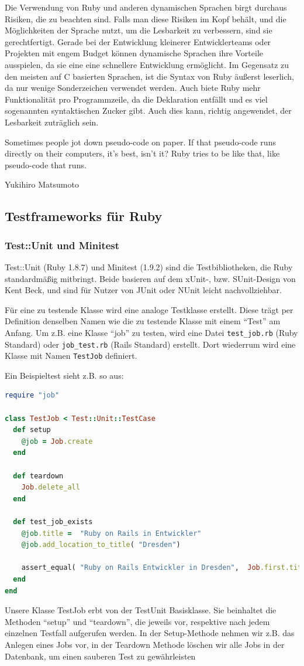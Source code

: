 Die Verwendung von Ruby und anderen dynamischen Sprachen birgt durchaus Risiken, die zu beachten sind. Falls man diese Risiken im Kopf behält, und die Möglichkeiten der Sprache nutzt, um die Lesbarkeit zu verbessern, sind sie gerechtfertigt. Gerade bei der Entwicklung kleinerer Entwicklerteams oder Projekten mit engem Budget können dynamische Sprachen ihre Vorteile ausspielen, da sie eine eine schnellere Entwicklung ermöglicht. Im Gegensatz zu den meisten auf C basierten Sprachen, ist die Syntax von Ruby äußerst leserlich, da nur wenige Sonderzeichen verwendet werden. Auch biete Ruby mehr Funktionalität pro Programmzeile, da die Deklaration entfällt und es viel sogenannten syntaktischen Zucker gibt. Auch dies kann, richtig angewendet, der Lesbarkeit zuträglich sein.
\epigraph{Sometimes people jot down pseudo-code on paper. If that pseudo-code runs directly on their computers, it's best, isn't it? Ruby tries to be like that, like pseudo-code that runs. }{Yukihiro Matsumoto}


\subsection{Testframeworks für Ruby}
\subsubsection{Test::Unit und Minitest}
Test::Unit (Ruby 1.8.7) und Minitest (1.9.2) sind die Testbibliotheken, die Ruby standardmäßig mitbringt. Beide basieren auf dem xUnit-, bzw. SUnit-Design von Kent Beck, und sind für Nutzer von JUnit oder NUnit leicht nachvollziehbar. %

Für eine zu testende Klasse wird eine analoge Testklasse erstellt. Diese trägt per Definition denselben Namen wie die zu testende Klasse mit einem "`Test"' am Anfang. Um z.B. eine Klasse "`job"' zu testen, wird eine Datei \texttt{test\_job.rb} (Ruby Standard) oder \texttt{job\_test.rb} (Rails Standard) erstellt. Dort wiederrum wird eine Klasse mit Namen \texttt{TestJob} definiert. 

Ein Beispieltest sieht z.B. so aus:
\begin{lstlisting}[language=Ruby,label=Testen mit Test::Unit,caption=Testen mit Test::Unit in Ruby]
require "job"

class TestJob < Test::Unit::TestCase
  def setup
    @job = Job.create
  end
  
  def teardown
    Job.delete_all
  end
  
  def test_job_exists
    @job.title =  "Ruby on Rails in Entwickler"
    @job.add_location_to_title( "Dresden")
    
    assert_equal( "Ruby on Rails Entwickler in Dresden",  Job.first.title)
  end
end
\end{lstlisting}
Unsere Klasse TestJob erbt von der TestUnit Basisklasse. Sie beinhaltet die Methoden "`setup"' und "`teardown"', die jeweils vor, respektive nach jedem einzelnen Testfall aufgerufen werden.
In der Setup-Methode nehmen wir z.B. das Anlegen eines Jobs vor, in der Teardown Methode löschen wir alle Jobs in der Datenbank, um einen sauberen Test zu gewährleisten

